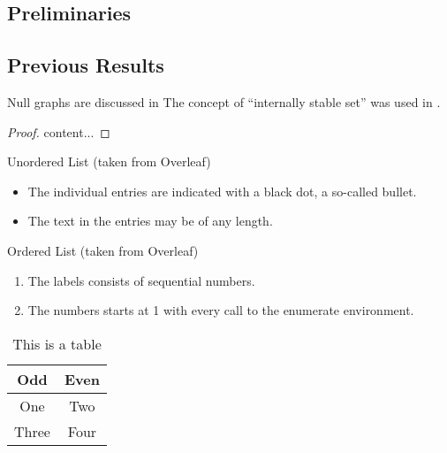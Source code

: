 
\lipsum[2]

\subsection{Preliminaries}
\label{sec:pre}

\lipsum[3]

\subsection{Previous Results}
\label{sec:prev-results}

Null graphs are discussed in \cite{HararyR74}
The concept of ``internally stable set'' was used in \cite{Berge57, Berge58}.

\begin{theorem}
	\label{thrm:1}
	\lipsum[4]
\end{theorem}
\begin{proof}
	content...
\end{proof}

\begin{corollary}
\label{cor:1}

\lipsum[5]
\end{corollary}

Unordered List (taken from Overleaf)
\begin{itemize}
	\item The individual entries are indicated with a black dot, a so-called bullet.
	\item The text in the entries may be of any length.
\end{itemize}

Ordered List (taken from Overleaf)
\begin{enumerate}
	\item The labels consists of sequential numbers.
	\item The numbers starts at 1 with every call to the enumerate environment.
\end{enumerate}

\begin{table}[ht]
	\centering
	\begin{tabular}{|c|c|}
		\hline
		\textbf{Odd} & \textbf{Even} \\
		\hline\hline
		One & Two \\
		\hline
		Three & Four \\
		\hline
	\end{tabular}
	\caption{This is a table}
	\label{tbl:1}
\end{table}

